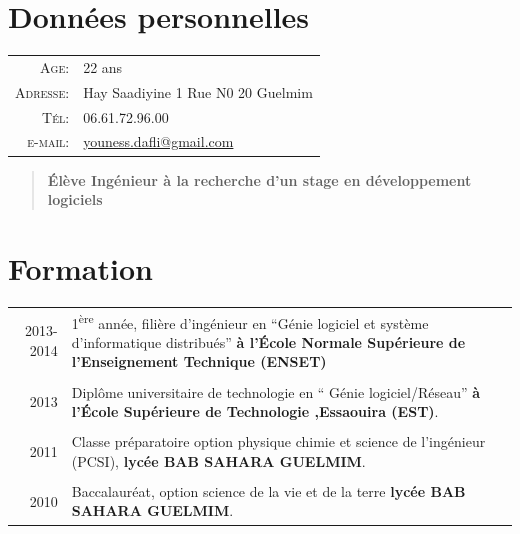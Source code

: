 \documentclass[a4paper,10pt]{article} %
\begin{document}
\section{Données personnelles}

\begin{tabular}{rl}
\textsc{Age:} & 22 ans \\
\textsc{Adresse:} & Hay Saadiyine 1 Rue N0 20 Guelmim  \\
\textsc{Tél:} & 06.61.72.96.00\\
\textsc{e-mail:} & \href{mailto:youness.dafli@gmail.com}{youness.dafli@gmail.com}
\end{tabular}


\vspace{15pt}
\begin{quotation}
\textbf{Élève Ingénieur à la recherche d'un stage en développement logiciels}
\end{quotation}
\vspace{5pt}
              

\section{Formation}

\begin{tabular}{r|p{13cm}}	
\textsc {2013-2014} & 
1\textsuperscript{ère} année, filière d'ingénieur en ``Génie logiciel et système d'informatique distribués''
\textbf{à l'École Normale Supérieure de l'Enseignement Technique (ENSET)}\\ \multicolumn{2}{c}{} \\


\textsc{2013} & Diplôme universitaire de technologie en `` Génie logiciel/Réseau'' \textbf{à l'École  Supérieure de Technologie ,Essaouira (EST)}.\\ \multicolumn{2}{c}{} \\


\textsc{2011} & Classe préparatoire option physique chimie et science de l'ingénieur (PCSI),
\textbf{lycée BAB SAHARA GUELMIM}.\\ \multicolumn{2}{c}{} \\


\textsc{2010} &  Baccalauréat, option science de la vie et de la terre \textbf{lycée BAB SAHARA GUELMIM}.
\end{tabular}
\end{document}
